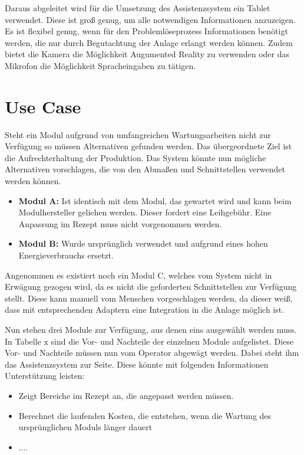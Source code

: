 Daraus abgeleitet wird für die Umsetzung des Assistenzsystem ein Tablet verwendet. Diese ist groß genug, um alle notwendigen Informationen anzuzeigen. Es ist flexibel genug, wenn für den Problemlöseprozess Informationen benötigt werden, die nur durch Begutachtung der Anlage erlangt werden können. Zudem bietet die Kamera die Möglichkeit Augumented Reality zu verwenden oder das Mikrofon die Möglichkeit Spracheingaben zu tätigen.

\section{Use Case}
Steht ein Modul aufgrund von umfangreichen Wartungsarbeiten nicht zur Verfügung so müssen Alternativen gefunden werden. Das übergeordnete Ziel ist die Aufrechterhaltung der Produktion. Das System könnte nun mögliche Alternativen vorschlagen, die von den Abmaßen und Schnittstellen verwendet werden können.
\begin{itemize}
\item \textbf{Modul A:} Ist identisch mit dem Modul, das gewartet wird und kann beim Modulhersteller geliehen werden. Dieser fordert eine Leihgebühr. Eine Anpassung im Rezept muss nicht vorgenommen werden.
\item \textbf{Modul B:} Wurde ursprünglich verwendet und aufgrund eines hohen Energieverbrauchs ersetzt.
\end{itemize}
Angenommen es existiert noch ein Modul C, welches vom System nicht in Erwägung gezogen wird, da es nicht die geforderten Schnittstellen zur Verfügung stellt. Diese kann manuell vom Menschen vorgeschlagen werden, da dieser weiß, dass mit entsprechenden Adaptern eine Integration in die Anlage möglich ist.

Nun stehen drei Module zur Verfügung, aus denen eins ausgewählt werden muss. In Tabelle x sind die Vor- und Nachteile der einzelnen Module aufgelistet. Diese Vor- und Nachteile müssen nun vom Operator abgewägt werden. Dabei steht ihm das Assistenzsystem zur Seite. Diese könnte mit folgenden Informationen Unterstützung leisten:
\begin{itemize}
\item Zeigt Bereiche im Rezept an, die angepasst werden müssen.
\item Berechnet die laufenden Kosten, die entstehen, wenn die Wartung des ursprünglichen Moduls länger dauert
\item ....
\end{itemize}

